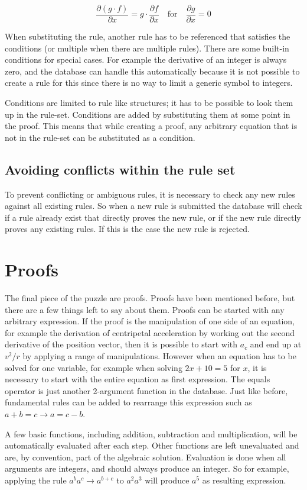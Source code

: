 \documentclass{article}
\begin{document}
\begin{equation} \frac{\partial (g\cdot f)}{\partial x}=g\cdot\frac{\partial f}{\partial x}
\quad\textrm{for}\quad
\frac{\partial g}{\partial x}=0
\end{equation}

When substituting the rule, another rule has to be referenced that satisfies the conditions (or multiple when there are multiple rules). There are some built-in conditions for special cases. For example the derivative of an integer is always zero, and the database can handle this automatically because it is not possible to create a rule for this since there is no way to limit a generic symbol to integers. \par
Conditions are limited to rule like structures; it has to be possible to look them up in the rule-set. Conditions are added by substituting them at some point in the proof. This means that while creating a proof, any arbitrary equation that is not in the rule-set can be substituted as a condition.

\subsection{Avoiding conflicts within the rule set}
To prevent conflicting or ambiguous rules, it is necessary to check any new rules against all existing rules. So when a new rule is submitted the database will check if a rule already exist that directly proves the new rule, or if the new rule directly proves any existing rules. If this is the case the new rule is rejected.

\section{Proofs}
The final piece of the puzzle are proofs. Proofs have been mentioned before, but there are a few things left to say about them. Proofs can be started with any arbitrary expression. If the proof is the manipulation of one side of an equation, for example the derivation of centripetal acceleration by working out the second derivative of the position vector, then it is possible to start with $a_c$ and end up at $v^2/r$ by applying a range of manipulations. However when an equation has to be solved for one variable, for example when solving $2x+10=5$ for $x$, it is necessary to start with the entire equation as first expression. The equals operator is just another 2-argument function in the database. Just like before, fundamental rules can be added to rearrange this expression such as $a+b=c\rightarrow a=c-b$. \par
A few basic functions, including addition, subtraction and multiplication, will be automatically evaluated after each step. Other functions are left unevaluated and are, by convention, part of the algebraic solution. Evaluation is done when all arguments are integers, and should always produce an integer. So for example, applying the rule $a^ba^c\rightarrow a^{b+c}$ to $a^2a^3$ will produce $a^5$ as resulting expression.
\end{document}
